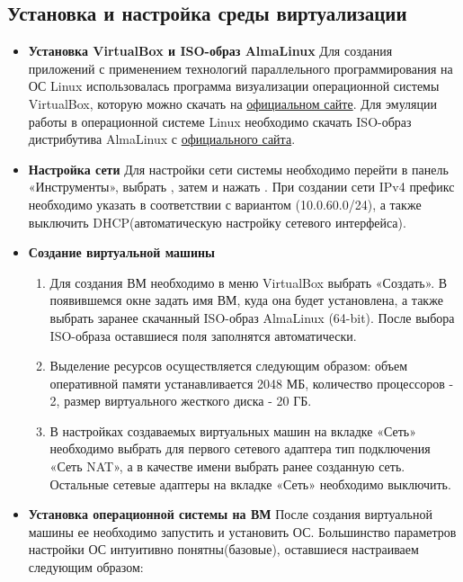 \documentclass[11pt,a4paper,final]{article}
\begin{document}
\subsection{Установка и настройка среды виртуализации}
\begin{itemize}
	\item {\bf Установка VirtualBox и ISO-образ AlmaLinux} \newline
	Для создания приложений с применением технологий параллельного программирования на ОС Linux использовалась программа визуализации операционной системы VirtualBox, которую можно скачать на \href{https://www.virtualbox.org/wiki/Downloads}{официальном сайте}. Для эмуляции работы в операционной системе Linux необходимо скачать ISO-образ дистрибутива AlmaLinux с \href{https://almalinux.org/ru/}{официального сайта}.
	\item {\bf Настройка сети}\newline
	Для настройки сети системы необходимо перейти в панель «Инструменты», выбрать , затем  и нажать . При создании сети IPv4 префикс необходимо указать в соответствии с вариантом (10.0.60.0/24), а также выключить DHCP(автоматическую настройку сетевого интерфейса).
	\item {\bf Создание виртуальной машины}
	\begin{enumerate}
		\item Для создания ВМ необходимо в меню VirtualBox выбрать «Создать». В появившемся окне задать имя ВМ, куда она будет установлена, а также выбрать заранее скачанный ISO-образ AlmaLinux (64-bit). После выбора ISO-образа оставшиеся поля заполнятся автоматически.
		\item Выделение ресурсов осуществляется следующим образом: объем оперативной памяти устанавливается 2048 МБ, количество процессоров - 2, размер виртуального жесткого диска - 20 ГБ. 
		\item В настройках создаваемых виртуальных машин на вкладке «Сеть» необходимо выбрать для первого сетевого адаптера тип подключения «Сеть NAT», а в качестве имени выбрать ранее созданную сеть.  Остальные сетевые адаптеры на вкладке «Сеть» необходимо выключить.
	\end{enumerate}
	\item {\bf Установка операционной системы на ВМ} \newline
	После создания виртуальной машины ее необходимо запустить и установить ОС. Большинство параметров настройки ОС интуитивно понятны(базовые), оставшиеся настраиваем следующим образом:

\end{itemize}
\end{document}
